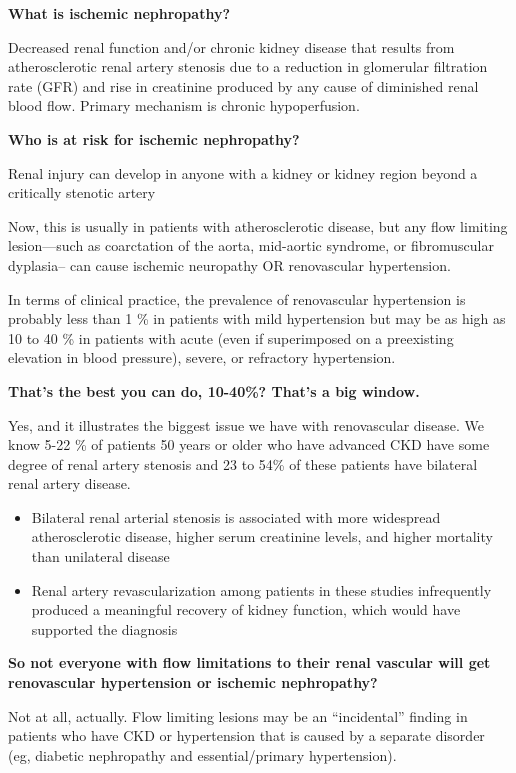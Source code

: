 \documentclass[
]{book}
\begin{document}
\textbf{What is ischemic nephropathy?}

Decreased renal function and/or chronic kidney disease that results from
atherosclerotic renal artery stenosis due to a reduction in glomerular
filtration rate (GFR) and rise in creatinine produced by any cause of
diminished renal blood flow. Primary mechanism is chronic hypoperfusion.
\citep{rickey125RenovascularDisease2019}

\textbf{Who is at risk for ischemic nephropathy?}

Renal injury can develop in anyone with a kidney or kidney region beyond
a critically stenotic artery

Now, this is usually in patients with atherosclerotic disease, but any
flow limiting lesion---such as coarctation of the aorta, mid-aortic
syndrome, or fibromuscular dyplasia-- can cause ischemic neuropathy OR
renovascular hypertension.

In terms of clinical practice, the prevalence of renovascular
hypertension is probably less than 1 \% in patients with mild
hypertension but may be as high as 10 to 40 \% in patients with acute
(even if superimposed on a preexisting elevation in blood pressure),
severe, or refractory hypertension.

\textbf{That's the best you can do, 10-40\%? That's a big window.}

Yes, and it illustrates the biggest issue we have with renovascular
disease. We know 5-22 \% of patients 50 years or older who have advanced
CKD have some degree of renal artery stenosis and 23 to 54\% of these
patients have bilateral renal artery disease.

\begin{itemize}
\item
  Bilateral renal arterial stenosis is associated with more widespread
  atherosclerotic disease, higher serum creatinine levels, and higher
  mortality than unilateral disease
\item
  Renal artery revascularization among patients in these studies
  infrequently produced a meaningful recovery of kidney function,
  which would have supported the diagnosis
\end{itemize}

\textbf{So not everyone with flow limitations to their renal vascular will get
renovascular hypertension or ischemic nephropathy?}

Not at all, actually. Flow limiting lesions may be an ``incidental''
finding in patients who have CKD or hypertension that is caused by a
separate disorder (eg, diabetic nephropathy and essential/primary
hypertension).
\end{document}
